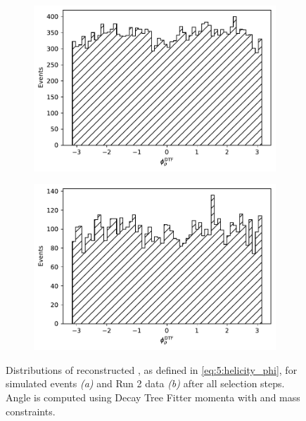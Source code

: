 \begin{figure}[t]
	\centering
	\begin{subfigure}{.45\textwidth}
		\includegraphics[height=.2\textheight]{graphics/05-angular_distributions/MCRECO_phi_reco.pdf}
		\caption{}
		\label{fig:5:MCRECO_phi_reco}
	\end{subfigure}
	\begin{subfigure}{.45\textwidth}
		\includegraphics[height=.2\textheight]{graphics/05-angular_distributions/RUN2_phi_reco.pdf}
		\caption{}
		\label{fig:5:RUN2_phi_reco}
	\end{subfigure}
	\caption{Distributions of reconstructed \phip, as defined in \eqref{eq:5:helicity_phi}, for simulated \demonstratorshort events \textit{(a)} and Run 2 data \textit{(b)} after all selection steps. Angle \phip is computed using Decay Tree Fitter momenta with \jpsi and \lz mass constraints.}
	\label{fig:5:phi_distributions_reco}
\end{figure}

